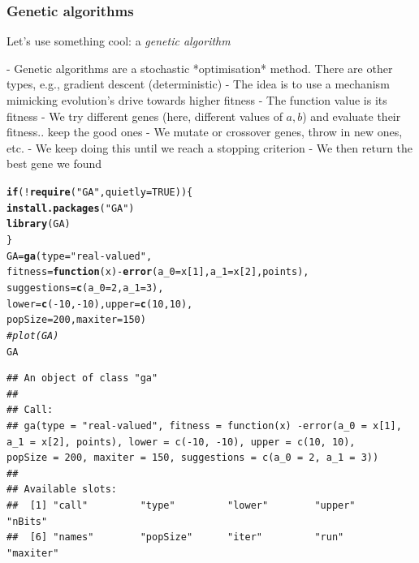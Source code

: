 \documentclass[aspectratio=169]{beamer}\usepackage[]{graphicx}\usepackage[]{xcolor}
\makeatletter
\newcommand{\hlnum}[1]{\textcolor[rgb]{0.686,0.059,0.569}{#1}}%
\newcommand{\hlsng}[1]{\textcolor[rgb]{0.192,0.494,0.8}{#1}}%
\newcommand{\hlcom}[1]{\textcolor[rgb]{0.678,0.584,0.686}{\textit{#1}}}%
\newcommand{\hlopt}[1]{\textcolor[rgb]{0,0,0}{#1}}%
\newcommand{\hldef}[1]{\textcolor[rgb]{0.345,0.345,0.345}{#1}}%
\newcommand{\hlkwa}[1]{\textcolor[rgb]{0.161,0.373,0.58}{\textbf{#1}}}%
\newcommand{\hlkwb}[1]{\textcolor[rgb]{0.69,0.353,0.396}{#1}}%
\newcommand{\hlkwc}[1]{\textcolor[rgb]{0.333,0.667,0.333}{#1}}%
\newcommand{\hlkwd}[1]{\textcolor[rgb]{0.737,0.353,0.396}{\textbf{#1}}}%
\newenvironment{kframe}{%
 \def\at@end@of@kframe{}%
 \ifinner\ifhmode%
  \def\at@end@of@kframe{\end{minipage}}%
  \begin{minipage}{\columnwidth}%
 \fi\fi%
 \def\FrameCommand##1{\hskip\@totalleftmargin \hskip-\fboxsep
 \colorbox{shadecolor}{##1}\hskip-\fboxsep
     \hskip-\linewidth \hskip-\@totalleftmargin \hskip\columnwidth}%
 \MakeFramed {\advance\hsize-\width
   \@totalleftmargin\z@ \linewidth\hsize
   \@setminipage}}%
 {\par\unskip\endMakeFramed%
 \at@end@of@kframe}
\newenvironment{knitrout}{}{} %
\makeatother
\begin{document}
\begin{frame}\frametitle{Genetic algorithms}
Let's use something cool: a \emph{genetic algorithm}

- Genetic algorithms are a stochastic *optimisation* method. There are other types, e.g., gradient descent (deterministic)
- The idea is to use a mechanism mimicking evolution's drive towards higher fitness
- The function value is its fitness
- We try different genes (here, different values of $a,b$) and evaluate their fitness.. keep the good ones
- We mutate or crossover genes, throw in new ones, etc.
- We keep doing this until we reach a stopping criterion
- We then return the best gene we found
\end{frame}


\begin{frame}[fragile]
\begin{knitrout}
\color{fgcolor}\begin{kframe}
\begin{alltt}
\hlkwa{if} \hldef{(}\hlopt{!}\hlkwd{require}\hldef{(}\hlsng{"GA"}\hldef{,} \hlkwc{quietly} \hldef{=} \hlnum{TRUE}\hldef{)) \{}
  \hlkwd{install.packages}\hldef{(}\hlsng{"GA"}\hldef{)}
  \hlkwd{library}\hldef{(GA)}
\hldef{\}}
\hldef{GA} \hlkwb{=} \hlkwd{ga}\hldef{(}\hlkwc{type} \hldef{=} \hlsng{"real-valued"}\hldef{,}
        \hlkwc{fitness} \hldef{=} \hlkwa{function}\hldef{(}\hlkwc{x}\hldef{)} \hlopt{-}\hlkwd{error}\hldef{(}\hlkwc{a_0} \hldef{= x[}\hlnum{1}\hldef{],} \hlkwc{a_1} \hldef{= x[}\hlnum{2}\hldef{], points),}
        \hlkwc{suggestions} \hldef{=} \hlkwd{c}\hldef{(}\hlkwc{a_0} \hldef{=} \hlnum{2}\hldef{,} \hlkwc{a_1} \hldef{=} \hlnum{3}\hldef{),}
        \hlkwc{lower} \hldef{=} \hlkwd{c}\hldef{(}\hlopt{-}\hlnum{10}\hldef{,} \hlopt{-}\hlnum{10}\hldef{),} \hlkwc{upper} \hldef{=} \hlkwd{c}\hldef{(}\hlnum{10}\hldef{,} \hlnum{10}\hldef{),}
        \hlkwc{popSize} \hldef{=} \hlnum{200}\hldef{,} \hlkwc{maxiter} \hldef{=} \hlnum{150}\hldef{)}
\hlcom{# plot(GA)}
\hldef{GA}
\end{alltt}
\begin{verbatim}
## An object of class "ga"
## 
## Call:
## ga(type = "real-valued", fitness = function(x) -error(a_0 = x[1],     a_1 = x[2], points), lower = c(-10, -10), upper = c(10, 10),     popSize = 200, maxiter = 150, suggestions = c(a_0 = 2, a_1 = 3))
## 
## Available slots:
##  [1] "call"         "type"         "lower"        "upper"        "nBits"       
##  [6] "names"        "popSize"      "iter"         "run"          "maxiter"     

\end{verbatim}
\end{kframe}
\end{knitrout}
\end{frame}
\end{document}
